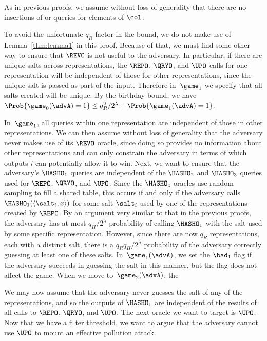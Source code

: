 As in previous proofs, we assume without loss of generality that there are no insertions of or queries for elements of $\col$.

To avoid the unfortunate $q_R$ factor in the bound, we do not make use of Lemma~\ref{thm:lemma1} in this proof. Because of that, we must find some other way to ensure that $\REVO$ is not useful to the adversary. In particular, if there are unique salts across representations, the $\REPO$, $\QRYO$, and $\UPO$ calls for one representation will be independent of those for other representations, since the unique salt is passed as part of the input. Therefore in~$\game_1$ we specify that all salts created will be unique. By the birthday bound, we have $\Prob{\game_0(\advA) = 1} \le q_R^2/2^\lambda + \Prob{\game_1(\advA) = 1}$.

In~$\game_1$, all queries within one representation are independent of those in other representations. We can then assume without loss of generality that the adversary never makes use of its $\REVO$ oracle, since doing so provides no information about other representations and can only constrain the adversary in terms of which outputs $i$ can potentially allow it to win. Next, we want to ensure that the adversary's $\HASHO_1$ queries are independent of the $\HASHO_2$ and $\HASHO_3$ queries used for $\REPO$, $\QRYO$, and $\UPO$. Since the $\HASHO_c$ oracles use random sampling to fill a shared table, this occurs if and only if the adversary calls $\HASHO_1(\langle\salt_i,x\rangle)$ for some salt $\salt_i$ used by one of the representations created by $\REPO$. By an argument very similar to that in the previous proofs, the adversary has at most $q_H/2^\lambda$ probability of calling $\HASHO_1$ with the salt used by some specific representation. However, since there are now $q_R$ representations, each with a distinct salt, there is a $q_Rq_H/2^\lambda$ probability of the adversary correctly guessing at least one of these salts. In~$\game_1(\advA)$, we set the $\bad_1$ flag if the adversary succeeds in guessing the salt in this manner, but the flag does not affect the game. When we move to~$\game_2(\advA)$, the %

We may now assume that the adversary never guesses the salt of any of the representations, and so the outputs of $\HASHO_1$ are independent of the results of all calls to $\REPO$, $\QRYO$, and $\UPO$. The next oracle we want to target is $\UPO$. Now that we have a filter threshold, we want to argue that the adversary cannot use $\UPO$ to mount an effective pollution attack.

